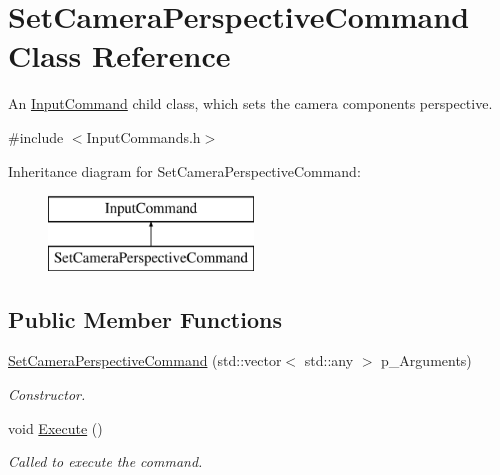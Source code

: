 \hypertarget{class_set_camera_perspective_command}{}\section{Set\+Camera\+Perspective\+Command Class Reference}
\label{class_set_camera_perspective_command}


An \mbox{\hyperlink{class_input_command}{Input\+Command}} child class, which sets the camera component\textquotesingle{}s perspective.  




{\ttfamily \#include $<$Input\+Commands.\+h$>$}

Inheritance diagram for Set\+Camera\+Perspective\+Command\+:\begin{figure}[H]
\begin{center}
\leavevmode
\includegraphics[height=2.000000cm]{class_set_camera_perspective_command}
\end{center}
\end{figure}
\subsection*{Public Member Functions}
\begin{DoxyCompactItemize}
\item 
\mbox{\hyperlink{class_set_camera_perspective_command_ae548893e7f8fcf7d1406ebeec580dead}{Set\+Camera\+Perspective\+Command}} (std\+::vector$<$ std\+::any $>$ p\+\_\+\+Arguments)
\begin{DoxyCompactList}\small\item\em Constructor. \end{DoxyCompactList}\item 
\mbox{\label{class_set_camera_perspective_command_a7f1d7bba4d5e39f4741695e4c853da97}} 
void \mbox{\hyperlink{class_set_camera_perspective_command_a7f1d7bba4d5e39f4741695e4c853da97}{Execute}} ()
\begin{DoxyCompactList}\small\item\em Called to execute the command. \end{DoxyCompactList}\end{DoxyCompactItemize}
